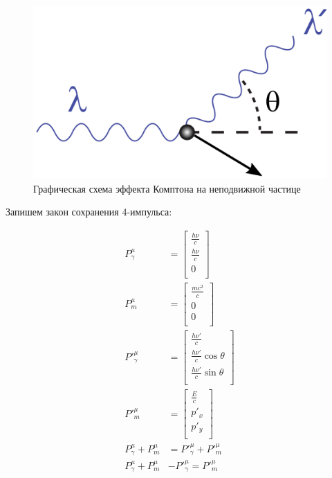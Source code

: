 \documentclass[a4paper,12pt]{article}
\begin{document}
\begin{figure}[h!]
	\centering
	\includegraphics[width=0.6\linewidth]{Compton_scattering}
	\caption{Графическая схема эффекта Комптона на неподвижной частице}
\end{figure}

Запишем закон сохранения 4-импульса:

\begin{align*}
	P^{\mu}_{\gamma} &= \begin{bmatrix}
						\frac{h\nu}{c} \\
						\frac{h\nu}{c} \\
						0 \\
					   \end{bmatrix} \\
%
	P^{\mu}_m &= \begin{bmatrix}
					\frac{mc^2}{c} \\
					0 \\
					0 \\
				\end{bmatrix} \\	
%
	P'^{\mu}_{\gamma} &= \begin{bmatrix}
					      \frac{h\nu'}{c} \\
					      \frac{h\nu'}{c} \cos \theta \\
					      \frac{h\nu'}{c} \sin \theta \\
						 \end{bmatrix} \\
%	
	P'^{\mu}_m 	&= \begin{bmatrix}
					       \frac{E}{c} \\
					       p'_x \\
					       p'_y \\
					\end{bmatrix} \\				 			   
	P^{\mu}_{\gamma} + P^{\mu}_m &= P'^{\mu}_{\gamma} + P'^{\mu}_m \\
%
	P^{\mu}_{\gamma} + P^{\mu}_m &- P'^{\mu}_{\gamma} =  P'^{\mu}_m \\
\end{align*}
\end{document}

